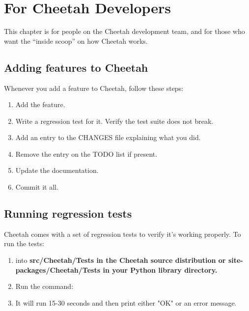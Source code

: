 \section{For Cheetah Developers}
\label{developer}

This chapter is for people on the Cheetah development team, and for those who
want the ``inside scoop'' on how Cheetah works.

\subsection{Adding features to Cheetah}

Whenever you add a feature to Cheetah, follow these steps:

\begin{enumerate}

\item  Add the feature.

\item  Write a regression test for it.  Verify the test suite does not break.

\item  Add an entry to the CHANGES file explaining what you did.

\item  Remove the entry on the TODO list if present.

\item  Update the documentation.

\item  Commit it all.

\end{enumerate}


\subsection{Running regression tests}

Cheetah comes with a set of regression tests to verify it's working properly.
To run the tests:

\begin{enumerate}

\item  {} into \bf{src/Cheetah/Tests} in the Cheetah source distribution 
     or \bf{site-packages/Cheetah/Tests} in your Python library directory.
     
\item  Run the command:  

\item  It will run 15-30 seconds and then print either "OK" or an error message.

\end{enumerate}

